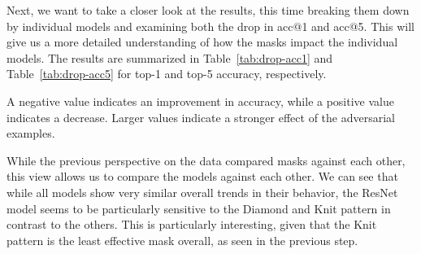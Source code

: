 \documentclass[a4paper, oneside]{discothesis}
\begin{document}
Next, we want to take a closer look at the results, this time breaking them down by individual models and examining both the drop in acc@1 and acc@5. This will give us a more detailed understanding of how the masks impact the individual models. The results are summarized in Table~\ref{tab:drop-acc1} and Table~\ref{tab:drop-acc5} for top-1 and top-5 accuracy, respectively.

A negative value indicates an improvement in accuracy, while a positive value indicates a decrease. Larger values indicate a stronger effect of the adversarial examples.

While the previous perspective on the data compared masks against each other, this view allows us to compare the models against each other. We can see that while all models show very similar overall trends in their behavior, the ResNet model seems to be particularly sensitive to the Diamond and Knit pattern in contrast to the others. This is particularly interesting, given that the Knit pattern is the least effective mask overall, as seen in the previous step.
\end{document}
